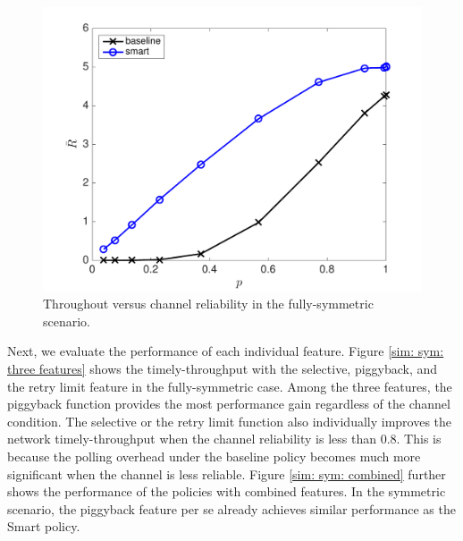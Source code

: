 \documentclass{article}
\begin{document}
\begin{figure}[htbp]
\centering
\includegraphics[scale=0.5]{R_p_sym.pdf}
\caption{Throughout versus channel reliability in the fully-symmetric scenario.}
\label{sim: sym: smart and baseline}
\end{figure}

Next, we evaluate the performance of each individual feature. Figure \ref{sim: sym: three features} shows the timely-throughput with the selective, piggyback, and the retry limit feature in the fully-symmetric case. Among the three features, the piggyback function provides the most performance gain regardless of the channel condition. The selective or the retry limit function also individually improves the network timely-throughput when the channel reliability is less than 0.8. This is because the polling overhead under the baseline policy becomes much more significant when the channel is less reliable. Figure \ref{sim: sym: combined} further shows the performance of the policies with combined features. In the symmetric scenario, the piggyback feature per se already achieves similar performance as the Smart policy. 
\end{document}
